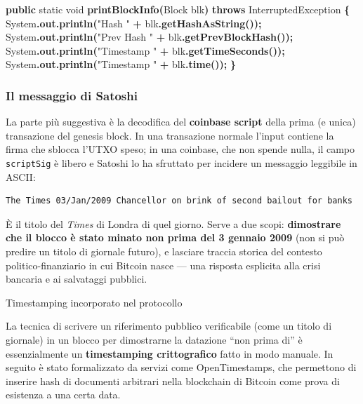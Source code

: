 \documentclass[
  italian,
  openany]{book}
\newenvironment{Shaded}{\begin{snugshade}}{\end{snugshade}}
\newcommand{\BuiltInTok}[1]{#1}
\newcommand{\DataTypeTok}[1]{\textcolor[rgb]{0.13,0.29,0.53}{#1}}
\newcommand{\FunctionTok}[1]{\textcolor[rgb]{0.13,0.29,0.53}{\textbf{#1}}}
\newcommand{\KeywordTok}[1]{\textcolor[rgb]{0.13,0.29,0.53}{\textbf{#1}}}
\newcommand{\NormalTok}[1]{#1}
\newcommand{\OperatorTok}[1]{\textcolor[rgb]{0.81,0.36,0.00}{\textbf{#1}}}
\newcommand{\StringTok}[1]{\textcolor[rgb]{0.31,0.60,0.02}{#1}}
\begin{document}
\begin{Shaded}
\begin{Highlighting}[]
\KeywordTok{public} \DataTypeTok{static} \DataTypeTok{void} \FunctionTok{printBlockInfo}\OperatorTok{(}\NormalTok{Block blk}\OperatorTok{)} \KeywordTok{throws} \BuiltInTok{InterruptedException} \OperatorTok{\{}
    \BuiltInTok{System}\OperatorTok{.}\FunctionTok{out}\OperatorTok{.}\FunctionTok{println}\OperatorTok{(}\StringTok{"Hash       "} \OperatorTok{+}\NormalTok{ blk}\OperatorTok{.}\FunctionTok{getHashAsString}\OperatorTok{());}
    \BuiltInTok{System}\OperatorTok{.}\FunctionTok{out}\OperatorTok{.}\FunctionTok{println}\OperatorTok{(}\StringTok{"Prev Hash  "} \OperatorTok{+}\NormalTok{ blk}\OperatorTok{.}\FunctionTok{getPrevBlockHash}\OperatorTok{());}
    \BuiltInTok{System}\OperatorTok{.}\FunctionTok{out}\OperatorTok{.}\FunctionTok{println}\OperatorTok{(}\StringTok{"Timestamp  "} \OperatorTok{+}\NormalTok{ blk}\OperatorTok{.}\FunctionTok{getTimeSeconds}\OperatorTok{());}
    \BuiltInTok{System}\OperatorTok{.}\FunctionTok{out}\OperatorTok{.}\FunctionTok{println}\OperatorTok{(}\StringTok{"Timestamp  "} \OperatorTok{+}\NormalTok{ blk}\OperatorTok{.}\FunctionTok{time}\OperatorTok{());}
\OperatorTok{\}}
\end{Highlighting}
\end{Shaded}

\subsubsection{Il messaggio di Satoshi}\label{il-messaggio-di-satoshi}

La parte più suggestiva è la decodifica del \textbf{coinbase script}
della prima (e unica) transazione del genesis block. In una transazione
normale l'input contiene la firma che sblocca l'UTXO speso; in una
coinbase, che non spende nulla, il campo \texttt{scriptSig} è libero e
Satoshi lo ha sfruttato per incidere un messaggio leggibile in ASCII:

\begin{verbatim}
The Times 03/Jan/2009 Chancellor on brink of second bailout for banks
\end{verbatim}

È il titolo del \emph{Times} di Londra di quel giorno. Serve a due
scopi: \textbf{dimostrare che il blocco è stato minato non prima del 3
gennaio 2009} (non si può predire un titolo di giornale futuro), e
lasciare traccia storica del contesto politico-finanziario in cui
Bitcoin nasce --- una risposta esplicita alla crisi bancaria e ai
salvataggi pubblici.

\begin{callouttip}{Timestamping incorporato nel protocollo}

La tecnica di scrivere un riferimento pubblico verificabile (come un
titolo di giornale) in un blocco per dimostrarne la datazione ``non
prima di'' è essenzialmente un \textbf{timestamping crittografico} fatto
in modo manuale. In seguito è stato formalizzato da servizi come
OpenTimestamps, che permettono di inserire hash di documenti arbitrari
nella blockchain di Bitcoin come prova di esistenza a una certa data.

\end{callouttip}
\end{document}
